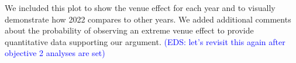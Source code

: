 \documentclass[12pt]{article}
\newcommand{\eds}[1]{\textcolor{blue}{(EDS: #1)}}
\begin{document}
We included this plot to show the venue effect for each year and to visually
demonstrate how 2022 compares to other years.  We added additional comments
about the probability of observing an extreme venue effect to provide
quantitative data supporting our argument.
\eds{let's revisit this again after objective 2 analyses are set}




\end{document}
